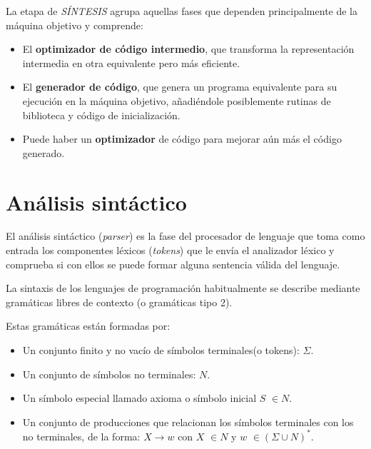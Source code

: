 La etapa de \textit{SÍNTESIS} agrupa aquellas fases que dependen principalmente de la máquina objetivo y comprende:	

\begin{itemize}

\item El \textbf{optimizador de código intermedio}, que transforma la representación intermedia en otra equivalente pero más eficiente.
\item El \textbf{generador de código}, que genera un programa equivalente para su ejecución en la máquina objetivo,  añadiéndole posiblemente rutinas de biblioteca y código de inicialización.
\item Puede haber un \textbf{optimizador }de código para mejorar aún más el código generado.

\end{itemize}


\section{Análisis sintáctico}

El análisis sintáctico (\textit{parser}) es la fase del procesador de lenguaje que toma como entrada los componentes léxicos (\textit{tokens}) que le envía el analizador léxico y comprueba si con ellos se puede formar alguna sentencia válida del lenguaje. 

La sintaxis de los lenguajes de programación habitualmente se describe mediante gramáticas libres de contexto (o gramáticas tipo 2).

Estas gramáticas están formadas por:
\begin{itemize}
	\item Un conjunto finito y no vacío de símbolos terminales(o tokens):  $\Sigma$.
	\item Un conjunto de símbolos no terminales:  $N$.
	\item  Un símbolo especial llamado axioma o símbolo inicial $S$ $\in N$.
	\item Un conjunto de producciones que relacionan los símbolos terminales con los no terminales, de la forma:
$ X\rightarrow w$ con $X$ $\in N$ y $w$ $\in(\Sigma\cup N)^{*}$.

\end{itemize}

%

